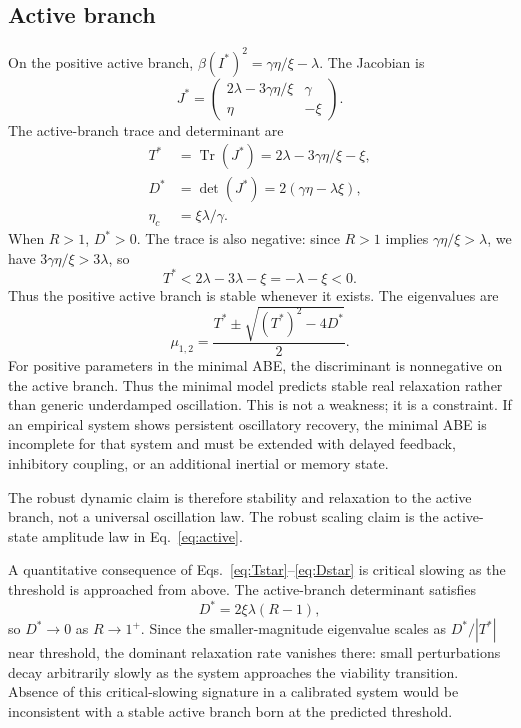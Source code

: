 \documentclass[11pt]{article}
\begin{document}
\subsection{Active branch}\label{sec:active-branch}
On the positive active branch, $\beta(I^*)^2=\gamma\eta/\xi-\lambda$. The Jacobian is
\begin{equation}
J^*=\begin{pmatrix}2\lambda-3\gamma\eta/\xi & \gamma\\ \eta & -\xi\end{pmatrix}. \label{eq:Jstar}
\end{equation}
The active-branch trace and determinant are
\begin{align}
T^*&=\operatorname{Tr}(J^*)=2\lambda-3\gamma\eta/\xi-\xi, \label{eq:Tstar}\\
D^*&=\det(J^*)=2(\gamma\eta-\lambda\xi), \label{eq:Dstar}\\
\eta_c&=\xi\lambda/\gamma. \label{eq:etac}
\end{align}
When $R>1$, $D^*>0$. The trace is also negative: since $R>1$ implies $\gamma\eta/\xi>\lambda$, we have $3\gamma\eta/\xi>3\lambda$, so
\begin{equation}
T^*<2\lambda-3\lambda-\xi=-\lambda-\xi<0. \label{eq:Tneg}
\end{equation}
Thus the positive active branch is stable whenever it exists. The eigenvalues are
\begin{equation}
\mu_{1,2}=\frac{T^*\pm\sqrt{(T^*)^2-4D^*}}{2}. \label{eq:eigs}
\end{equation}
For positive parameters in the minimal ABE, the discriminant is nonnegative on the active branch. Thus the minimal model predicts stable real relaxation rather than generic underdamped oscillation. This is not a weakness; it is a constraint. If an empirical system shows persistent oscillatory recovery, the minimal ABE is incomplete for that system and must be extended with delayed feedback, inhibitory coupling, or an additional inertial or memory state.

The robust dynamic claim is therefore stability and relaxation to the active branch, not a universal oscillation law. The robust scaling claim is the active-state amplitude law in Eq.~\eqref{eq:active}.

A quantitative consequence of Eqs.~\eqref{eq:Tstar}--\eqref{eq:Dstar} is critical slowing as the threshold is approached from above. The active-branch determinant satisfies 
\begin{equation}
D^*=2\xi\lambda(R-1),
\end{equation}
\noindent so $D^*\to 0$ as $R\to 1^+$. Since the smaller-magnitude eigenvalue scales as $D^*/|T^*|$ near threshold, the dominant relaxation rate vanishes there: small perturbations decay arbitrarily slowly as the system approaches the viability transition. Absence of this critical-slowing signature in a calibrated system would be inconsistent with a stable active branch born at the predicted threshold.
\end{document}
